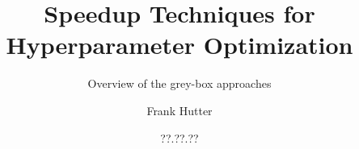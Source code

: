 %


%

\title[AutoML: Grey-box Approaches]{Speedup Techniques for Hyperparameter Optimization}
\subtitle{Overview of the grey-box approaches}
\author[Frank Hutter]{Frank Hutter}
\date{??.??.??}





	
	\maketitle


	








